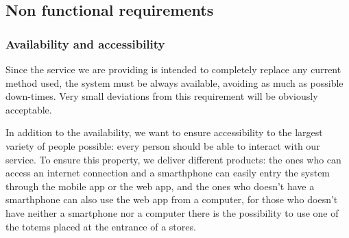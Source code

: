 %
%
\subsection{Non functional requirements}
\label{subsect:softwaresystemattributes}

\subsubsection{Availability and accessibility}
\label{subsubsect:availabilityandaccessibility}

Since the service we are providing is intended to completely replace any current method used, the system must be always available, avoiding as much as possible down-times. Very small deviations from this requirement will be obviously acceptable.

In addition to the availability, we want to ensure accessibility to the largest variety of people possible: every person should be able to interact with our service. To ensure this property, we deliver different products: the ones who can access an internet connection and a smarthphone can easily entry the system through the mobile app or the web app, and the ones who doesn't have a smarthphone can also use the web app from a computer, for those who doesn't have neither a smartphone nor a computer there is the possibility to use one of the totems placed at the entrance of a stores.

